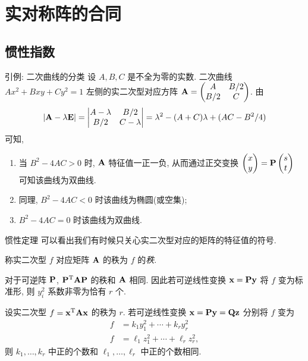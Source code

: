 \section{实对称阵的合同}

\subsection{惯性指数}

\begin{frame}{引例: 二次曲线的分类}
	\onslide<+->
	设 $A,B,C$ 是不全为零的实数.
	二次曲线 $Ax^2+Bxy+Cy^2=1$ 左侧的实二次型对应方阵 ${\mathbf{A}}=\begin{pmatrix}
		A&B/2\\
		B/2&C
	\end{pmatrix}$.
	\onslide<+->
	由
	\[|{\mathbf{A}}-\lambda{\mathbf{E}}|=\begin{vmatrix}
		A-\lambda&B/2\\
		B/2&C-\lambda
	\end{vmatrix}=\lambda^2-(A+C)\lambda+(AC-B^2/4)\]
	可知,
	\onslide<+->
	\begin{enumerate}
		\item 当 $B^2-4AC>0$ 时, ${\mathbf{A}}$ 特征值一正一负, 
		\onslide<+->
		从而通过正交变换 $\begin{pmatrix}
			x\\y
		\end{pmatrix}={\mathbf{P}}\begin{pmatrix}
			s\\t
		\end{pmatrix}$ 可知该曲线为双曲线.
		\item 同理, $B^2-4AC<0$ 时该曲线为椭圆(或空集);
		\item $B^2-4AC=0$ 时该曲线为双曲线.
	\end{enumerate}
\end{frame}


\begin{frame}{惯性定理}
	\onslide<+->
	可以看出我们有时候只关心实二次型对应的矩阵的特征值的符号.
	\onslide<+->
	\begin{definition}
		称实二次型 $f$ 对应矩阵 ${\mathbf{A}}$ 的秩为 $f$ 的\emph{秩}.
	\end{definition}
	\onslide<+->
	对于可逆阵 ${\mathbf{P}}$, ${\mathbf{P}}^{\mathrm{T}}{\mathbf{A}}{\mathbf{P}}$ 的秩和 ${\mathbf{A}}$ 相同.
	\onslide<+->
	因此若可逆线性变换 ${\mathbf{x}}={\mathbf{P}}{\mathbf{y}}$ 将 $f$ 变为标准形, 则 $y_i^2$ 系数非零为恰有 $r$ 个.
	\onslide<+->
	\begin{theorem}[惯性定理]
		设实二次型 $f={\mathbf{x}}^{\mathrm{T}}{\mathbf{A}}{\mathbf{x}}$ 的秩为 $r$.
		若可逆线性变换 ${\mathbf{x}}={\mathbf{P}}{\mathbf{y}}={\mathbf{Q}}{\mathbf{z}}$ 分别将 $f$ 变为
		\begin{align*}
			f&=k_1y_1^2+\cdots+k_ry_r^2\\
			f&=\ell_1z_1^2+\cdots+\ell_rz_r^2,
		\end{align*}
		则 $k_1,\dots,k_r$ 中正的个数和 $\ell_1,\dots,\ell_r$ 中正的个数相同.
	\end{theorem}
\end{frame}


